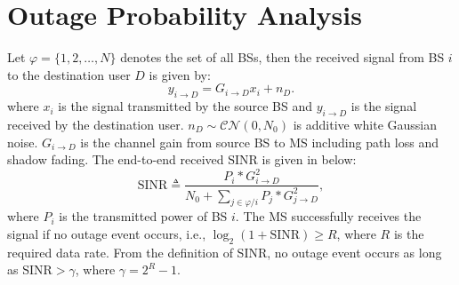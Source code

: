  \section{Outage Probability Analysis}
 \label{4:OutageProb}
 \par Let $\varphi = \{1, 2, \dots, N\}$ denotes the set of all BSs, then the received signal from BS $i$ to the destination user $D$ is given by:
 \begin{equation}
 y_{i\to D} = G_{i\to D}x_{i}+n_{D}.
 \end{equation}
 where $x_{i}$ is the signal transmitted by the source BS and $y_{i\to D}$ is the signal received by the destination user. $n_{D}\sim \mathcal{CN}(0,N_{0})$ is additive white Gaussian noise. $G_{i\to D}$ is the channel gain from source BS to MS including path loss and shadow fading. The end-to-end received $\text{SINR}$ is given in below:
 \begin{equation}
 \text{SINR} \triangleq \frac{P_{i}*G_{i\to D}^{2}}{N_{0}+\sum_{j\in \varphi/i}P_{j}*G_{j\to D}^2},
 \end{equation}
 where $P_{i}$ is the transmitted power of BS $i$. The MS successfully receives the signal if no outage event occurs, i.e., $\log_{2}(1+\text{SINR})\ge R$, where $R$ is the required data rate. From the definition of SINR, no outage event occurs as long as $\text{SINR} > \gamma$, where $\gamma = 2^{R}-1$.

